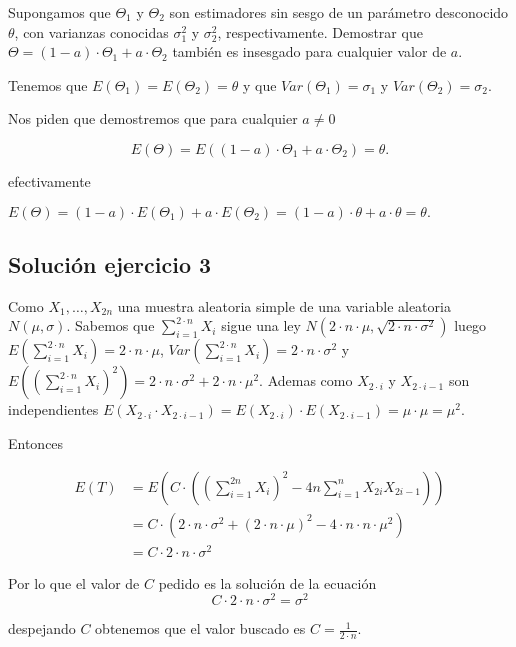 \documentclass[
]{article}
\begin{document}
Supongamos que \(\Theta_1\) y \(\Theta_2\) son estimadores sin sesgo de
un parámetro desconocido \(\theta\), con varianzas conocidas
\(\sigma_1^2\) y \(\sigma_2^2\), respectivamente. Demostrar que
\(\Theta =(1-a)\cdot\Theta_1 +a\cdot \Theta_2\) también es insesgado
para cualquier valor de \(a\).

Tenemos que \(E(\Theta_1)=E(\Theta_2)=\theta\) y que
\(Var(\Theta_1)=\sigma_1\) y \(Var(\Theta_2)=\sigma_2\).

Nos piden que demostremos que para cualquier \(a\not=0\)

\[
E(\Theta) =E\left((1-a)\cdot\Theta_1 +a\cdot \Theta_2\right)=\theta.
\]

efectivamente

\(E(\Theta)=(1-a)\cdot E(\Theta_1) +a\cdot E(\Theta_2)=(1-a)\cdot \theta +a\cdot \theta=\theta.\)

\hypertarget{soluciuxf3n-ejercicio-3}{%
\subsection{Solución ejercicio 3}\label{soluciuxf3n-ejercicio-3}}

Como \(X_1,\ldots,X_{2n}\) una muestra aleatoria simple de una variable
aleatoria \(N(\mu,\sigma)\). Sabemos que \(\sum_{i=1}^{2\cdot n} X_i\)
sigue una ley
\(N\left(2\cdot n\cdot\mu, \sqrt{2\cdot n \cdot\sigma^2}\right)\) luego
\(E\left(\sum_{i=1}^{2\cdot n} X_i\right)=2\cdot n\cdot \mu\),
\(Var(\sum_{i=1}^{2\cdot n} X_i)=2\cdot n\cdot \sigma^2\) y
\(E\left(\left(\sum_{i=1}^{2\cdot n}X_i\right)^2\right)=2\cdot n\cdot \sigma^2+2\cdot n\cdot\mu^2.\)
Ademas como \(X_{2\cdot i}\) y \(X_{2\cdot i-1}\) son independientes
\(E(X_{2\cdot i}\cdot X_{2\cdot i-1})=E(X_{2\cdot i})\cdot E(X_{2\cdot i-1})=\mu\cdot \mu=\mu^2.\)

Entonces

\[
\begin{array}{rl}
E(T)&=E\left(C\cdot\left(\left(\sum_{i=1}^{2n} X_i\right)^2- 4 n\sum_{i=1}^{n}
X_{2i} X_{2i-1}\right)\right)\\
& =C\cdot \left(2\cdot n\cdot\sigma^2+(2\cdot n\cdot\mu)^2-4\cdot n\cdot n\cdot \mu^2\right)\\
& = C\cdot2\cdot n\cdot\sigma^2
\end{array}
\]

Por lo que el valor de \(C\) pedido es la solución de la ecuación \[
C\cdot 2\cdot n\cdot\sigma^2=\sigma^2\]

despejando \(C\) obtenemos que el valor buscado es
\(C=\frac{1}{2\cdot n}.\)
\end{document}
